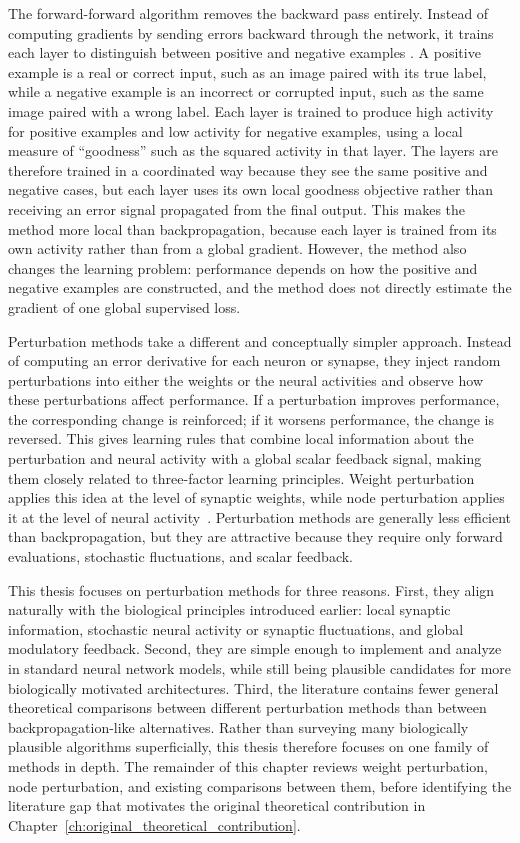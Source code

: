 The forward-forward algorithm removes the backward pass entirely. Instead of computing gradients by sending errors backward through the network, it trains each layer to distinguish between positive and negative examples \parencite{hinton_forward-forward_2022}. A positive example is a real or correct input, such as an image paired with its true label, while a negative example is an incorrect or corrupted input, such as the same image paired with a wrong label. Each layer is trained to produce high activity for positive examples and low activity for negative examples, using a local measure of ``goodness'' such as the squared activity in that layer. The layers are therefore trained in a coordinated way because they see the same positive and negative cases, but each layer uses its own local goodness objective rather than receiving an error signal propagated from the final output. This makes the method more local than backpropagation, because each layer is trained from its own activity rather than from a global gradient. However, the method also changes the learning problem: performance depends on how the positive and negative examples are constructed, and the method does not directly estimate the gradient of one global supervised loss.

Perturbation methods take a different and conceptually simpler approach. Instead of computing an error derivative for each neuron or synapse, they inject random perturbations into either the weights or the neural activities and observe how these perturbations affect performance. If a perturbation improves performance, the corresponding change is reinforced; if it worsens performance, the change is reversed. This gives learning rules that combine local information about the perturbation and neural activity with a global scalar feedback signal, making them closely related to three-factor learning principles. Weight perturbation applies this idea at the level of synaptic weights, while node perturbation applies it at the level of neural activity~\parencite{williams_simple_1992,werfel_learning_2003,hiratani_stability_2022}. Perturbation methods are generally less efficient than backpropagation, but they are attractive because they require only forward evaluations, stochastic fluctuations, and scalar feedback.

This thesis focuses on perturbation methods for three reasons. First, they align naturally with the biological principles introduced earlier: local synaptic information, stochastic neural activity or synaptic fluctuations, and global modulatory feedback. Second, they are simple enough to implement and analyze in standard neural network models, while still being plausible candidates for more biologically motivated architectures. Third, the literature contains fewer general theoretical comparisons between different perturbation methods than between backpropagation-like alternatives. Rather than surveying many biologically plausible algorithms superficially, this thesis therefore focuses on one family of methods in depth. The remainder of this chapter reviews weight perturbation, node perturbation, and existing comparisons between them, before identifying the literature gap that motivates the original theoretical contribution in Chapter~\ref{ch:original_theoretical_contribution}.

